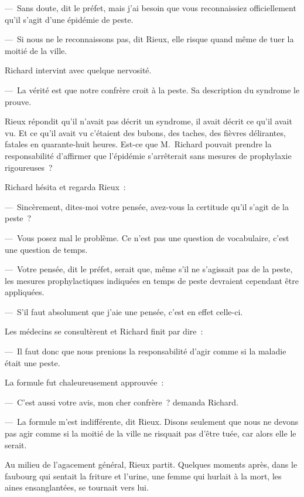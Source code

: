 \documentclass[french,twoside]{book} %
\begin{document}
— Sans doute, dit le préfet, mais j’ai besoin que vous reconnaissiez officiellement qu’il s’agit d’une épidémie de peste.\par
— Si nous ne le reconnaissons pas, dit Rieux, elle risque quand même de tuer la moitié de la ville.\par
Richard intervint avec quelque nervosité.\par
— La vérité est que notre confrère croit à la peste. Sa description du syndrome le prouve.\par
Rieux répondit qu’il n’avait pas décrit un syndrome, il avait décrit ce qu’il avait vu. Et ce qu’il avait vu c’étaient des bubons, des taches, des fièvres délirantes, fatales en quarante-huit heures. Est-ce que M. Richard pouvait prendre la responsabilité d’affirmer que l’épidémie s’arrêterait sans mesures de prophylaxie rigoureuses ?\par
Richard hésita et regarda Rieux :\par
— Sincèrement, dites-moi votre pensée, avez-vous la certitude qu’il s’agit de la peste ?\par
— Vous posez mal le problème. Ce n’est pas une question de vocabulaire, c’est une question de temps.\par
— Votre pensée, dit le préfet, serait que, même s’il ne s’agissait pas de la peste, les mesures prophylactiques indiquées en temps de peste devraient cependant être appliquées.\par
— S’il faut absolument que j’aie une pensée, c’est en effet celle-ci.\par
Les médecins se consultèrent et Richard finit par dire :\par
— Il faut donc que nous prenions la responsabilité d’agir comme si la maladie était une peste.\par
La formule fut chaleureusement approuvée :\par
— C’est aussi votre avis, mon cher confrère ? demanda Richard.\par
— La formule m’est indifférente, dit Rieux. Disons seulement que nous ne devons pas agir comme si la moitié de la ville ne risquait pas d’être tuée, car alors elle le serait.\par
Au milieu de l’agacement général, Rieux partit. Quelques moments après, dans le faubourg qui sentait la friture et l’urine, une femme qui hurlait à la mort, les aines ensanglantées, se tournait vers lui.
\end{document}
